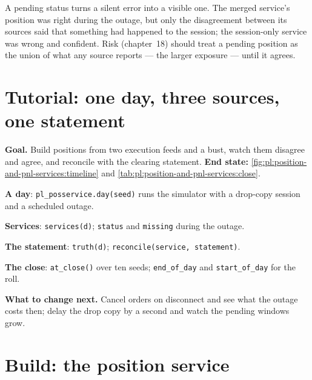 \begin{remark}\label{rem:pl:position-and-pnl-services:pending}
A pending status turns a silent error into a visible one. The merged service's position was right during the outage, but only the
disagreement between its sources said that something had happened to the session; the session-only service was wrong and confident. Risk
(chapter~18) should treat a pending position as the union of what any source reports --- the larger exposure --- until it agrees.
\end{remark}

\section{Tutorial: one day, three sources, one statement}\label{tut:pl:position-and-pnl-services:tut}

\begin{tutorial}
\textbf{Goal.} Build positions from two execution feeds and a bust, watch them disagree and agree, and reconcile with the clearing statement.
\textbf{End state:} \cref{fig:pl:position-and-pnl-services:timeline} and \cref{tab:pl:position-and-pnl-services:close}.
\begin{tutsteps}
\item \textbf{A day}: \texttt{pl\_posservice.day(seed)} runs the simulator with a drop-copy session and a scheduled outage.
\item \textbf{Services}: \texttt{services(d)}; \texttt{status} and \texttt{missing} during the outage.
\item \textbf{The statement}: \texttt{truth(d)}; \texttt{reconcile(service, statement)}.
\item \textbf{The close}: \texttt{at\_close()} over ten seeds; \texttt{end\_of\_day} and \texttt{start\_of\_day} for the roll.
\end{tutsteps}
\textbf{What to change next.} Cancel orders on disconnect and see what the outage costs then; delay the drop copy by a second and watch the
pending windows grow.
\end{tutorial}

\section{Build: the position service}\label{bld:pl:position-and-pnl-services:posservice}

